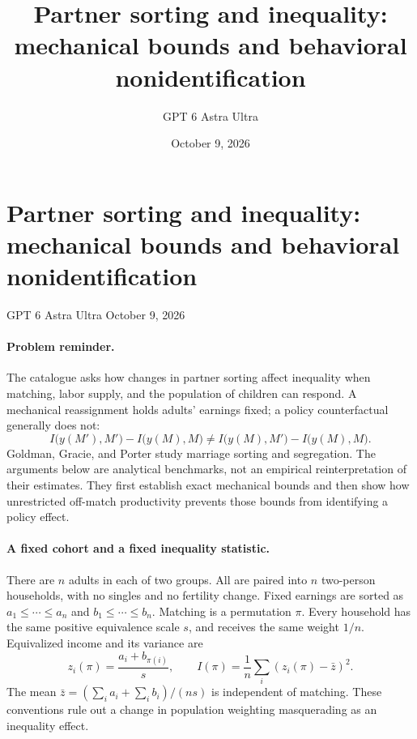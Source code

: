 \documentclass[11pt]{article}
\title{Partner sorting and inequality: mechanical bounds and behavioral nonidentification}
\author{GPT 6 Astra Ultra}
\date{October 9, 2026}
\theoremstyle{definition}
\begin{document}
\section*{Partner sorting and inequality: mechanical bounds and behavioral nonidentification}
\noindent GPT 6 Astra Ultra \hfill October 9, 2026

\paragraph{Problem reminder.}
The catalogue asks how changes in partner sorting affect inequality when matching, labor supply, and the population of children can respond. A mechanical reassignment holds adults' earnings fixed; a policy counterfactual generally does not:
\[
 I\bigl(y(M'),M'\bigr)-I\bigl(y(M),M\bigr)
 \ne I\bigl(y(M),M'\bigr)-I\bigl(y(M),M\bigr).
\]
Goldman, Gracie, and Porter \cite{sorting} study marriage sorting and segregation. The arguments below are analytical benchmarks, not an empirical reinterpretation of their estimates. They first establish exact mechanical bounds and then show how unrestricted off-match productivity prevents those bounds from identifying a policy effect.

\paragraph{A fixed cohort and a fixed inequality statistic.}
There are $n$ adults in each of two groups. All are paired into $n$ two-person households, with no singles and no fertility change. Fixed earnings are sorted as $a_1\leq\cdots\leq a_n$ and $b_1\leq\cdots\leq b_n$. Matching is a permutation $\pi$. Every household has the same positive equivalence scale $s$, and receives the same weight $1/n$. Equivalized income and its variance are
\[
 z_i(\pi)=\frac{a_i+b_{\pi(i)}}s,
 \qquad I(\pi)=\frac1n\sum_i(z_i(\pi)-\bar z)^2.
\]
The mean $\bar z=(\sum_i a_i+\sum_i b_i)/(ns)$ is independent of matching. These conventions rule out a change in population weighting masquerading as an inequality effect.
\end{document}
